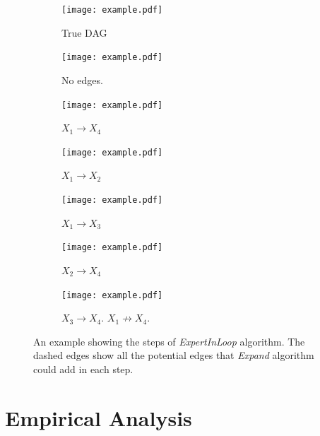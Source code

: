 \documentclass{uai2025} %
\begin{document}
\begin{figure}[t!]
	\begin{subfigure}{0.125 \textwidth}
		\centering
		\texttt{[image: example.pdf]}
		\caption{True DAG}
	\end{subfigure}%
	\begin{subfigure}{0.125 \textwidth}
		\centering
		\texttt{[image: example.pdf]}
		\caption{No edges.}
	\end{subfigure}%
	\begin{subfigure}{0.125 \textwidth}
		\centering
		\texttt{[image: example.pdf]}
		\caption{$ X_1 \rightarrow X_4 $}
	\end{subfigure}%
	\begin{subfigure}{0.125 \textwidth}
		\centering
		\texttt{[image: example.pdf]}
		\caption{$ X_1 \rightarrow X_2 $}
	\end{subfigure}
	\begin{subfigure}{0.125 \textwidth}
		\centering
		\texttt{[image: example.pdf]}
		\caption{$ X_1 \rightarrow X_3 $}
	\end{subfigure}%
	\begin{subfigure}{0.125 \textwidth}
		\centering
		\texttt{[image: example.pdf]}
		\caption{$ X_2 \rightarrow X_4 $}
	\end{subfigure}%
	\begin{subfigure}{0.250 \textwidth}
		\centering
		\texttt{[image: example.pdf]}
		\caption{$ X_3 \rightarrow X_4 $. $ X_1 \not \rightarrow X_4 $.}
	\end{subfigure}
	\caption{An example showing the steps of \textit{ExpertInLoop} algorithm. The dashed edges show all the potential edges that \textit{Expand} algorithm could add in each step.
	}
\end{figure}




\section{Empirical Analysis}
\label{sec:empirical}
\end{document}
